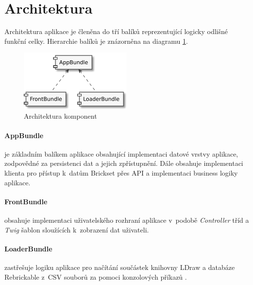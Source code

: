 \section{Architektura}
Architektura aplikace je členěna do tří balíků reprezentující logicky odlišné funkční celky. Hierarchie balíků je znázorněna na diagramu \ref{diagram-bundles}.

\begin{figure}[htbp]
    \centering
    \includegraphics[width=0.5\textwidth,height=\textheight,keepaspectratio]{pdfs/bundles}
    \caption{Architektura komponent\label{diagram-bundles}}
\end{figure}

\paragraph{AppBundle}  
je základním balíkem aplikace obsahující implementaci datové vrstvy aplikace, zodpovědné za persistenci dat a jejich zpřístupnění. Dále obsahuje implementaci klienta pro přístup k~datům Brickset přes API a implementaci business logiky aplikace.

\paragraph{FrontBundle} 
obsahuje implementaci uživatelského rozhraní aplikace v~podobě \textit{Controller} tříd a \textit{Twig} šablon sloužících k~zobrazení dat uživateli.

\paragraph{LoaderBundle} 
zastřešuje logiku aplikace pro načítání součástek knihovny LDraw a databáze Rebrickable z~\gls{CSV} souborů za pomoci konzolových příkazů \autocite{symfony:console}. 

